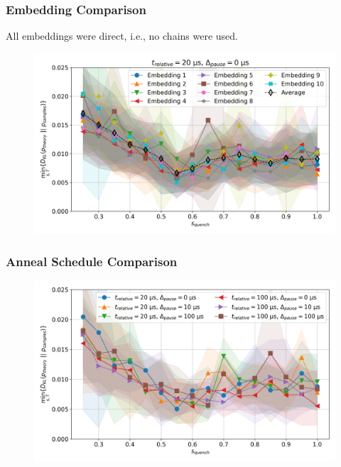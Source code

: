 \documentclass{beamer}
\begin{document}
\begin{frame}
    \frametitle{Embedding Comparison}
    All embeddings were direct, i.e., no chains were used.
    \begin{figure}
        \includegraphics[width=1\linewidth]{qbm/8x4/embedding_comparison/config_05/kl_divergence_mins.png}
    \end{figure}
\end{frame}

\begin{frame}
    \frametitle{Anneal Schedule Comparison}
    \begin{figure}
        \includegraphics[width=1\linewidth]{qbm/8x4/exact_analysis/config_05/embedding_10/kl_divergence_mins.png}
    \end{figure}
\end{frame}
\end{document}
